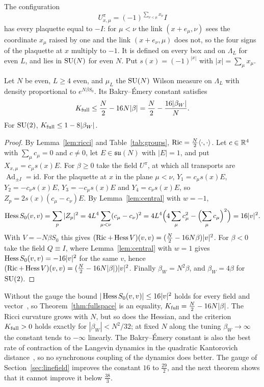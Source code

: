 The configuration
\begin{equation}\label{eq:piflux}
U^\pi_{x,\mu}=(-1)^{\sum_{\nu<\mu}x_\nu}I
\end{equation}
has every plaquette equal to $-I$: for $\mu<\nu$ the link $(x+e_\mu,\nu)$ sees
the coordinate $x_\mu$ raised by one and the link $(x+e_\nu,\mu)$ does not, so
the four signs of the plaquette at $x$ multiply to $-1$. It is defined on every
box and on $\Lambda_L$ for even $L$, and lies in $\mathrm{SU}(N)$ for even $N$. Put
$s(x)=(-1)^{|x|}$ with $|x|=\sum_\mu x_\mu$.

\begin{theorem}\label{thm:fullspace}
Let $N$ be even, $L\ge4$ even, and $\mu_L$ the $\mathrm{SU}(N)$ Wilson measure on
$\Lambda_L$ with density proportional to $e^{N\beta S_0}$. Its Bakry--\'Emery
constant satisfies
\[
K_{\rm full}\le\frac N2-16N|\beta|=\frac N2-\frac{16|\beta_W|}N .
\]
For $\mathrm{SU}(2)$, $K_{\rm full}\le1-8|\beta_W|$.
\end{theorem}

\begin{proof}
By Lemma~\ref{lem:ricci} and Table~\ref{tab:groups}, $\operatorname{Ric}=\frac N2\langle \cdot,\cdot\rangle$.
Let $c\in\mathbb{R}^4$ with $\sum_\mu c_\mu=0$ and $c\ne0$, let $E\in\mathfrak{su}(N)$
with $|E|=1$, and put $X_{x,\mu}=c_\mu s(x)E$. For $\beta\ge0$ take the field
$U^\pi$, at which all transports are $\operatorname{Ad}_{\pm I}=\mathrm{id}$.
For the plaquette at $x$ in the plane $\mu<\nu$, $Y_1=c_\mu s(x)E$,
$Y_2=-c_\nu s(x)E$, $Y_3=-c_\mu s(x)E$ and $Y_4=c_\nu s(x)E$, so $Z_p=2s(x)(c_\mu-
c_\nu)E$. By Lemma~\ref{lem:central} with $w=-1$,
\[
\operatorname{Hess} S_0(v,v)=\sum_p|Z_p|^2=4L^4\sum_{\mu<\nu}(c_\mu-c_\nu)^2=4L^4\Bigl(4\sum_\mu
c_\mu^2-\Bigl(\sum_\mu c_\mu\Bigr)^2\Bigr)=16|v|^2 .
\]
With $V=-N\beta S_0$ this gives $(\operatorname{Ric}+\operatorname{Hess} V)(v,v)=(\frac N2-16N\beta)|v|^2$.
For $\beta<0$ take the field $Q\equiv I$, where Lemma~\ref{lem:central} with
$w=1$ gives $\operatorname{Hess} S_0(v,v)=-16|v|^2$ for the same $v$, hence $(\operatorname{Ric}+\operatorname{Hess} V)(v,
v)=(\frac N2-16N|\beta|)|v|^2$. Finally $\beta_W=N^2\beta$, and $\beta_W=4\beta$
for $\mathrm{SU}(2)$.
\end{proof}

Without the gauge the bound $|\operatorname{Hess} S_0(v,v)|\le16|v|^2$ holds for every field
and vector~\cite{BB26a}, so Theorem~\ref{thm:fullspace} is an equality,
$K_{\rm full}=\frac N2-16N|\beta|$. The Ricci curvature grows with $N$, but so
does the Hessian, and the criterion $K_{\rm full}>0$ holds exactly for
$|\beta_W|<N^2/32$; at fixed $N$ along the tuning $\beta_W\to\infty$ the
constant tends to $-\infty$ linearly. The Bakry--\'Emery constant is also the
best rate of contraction of the Langevin dynamics in the quadratic Kantorovich
distance~\cite{vRS05}, so no synchronous coupling of the dynamics does better.
The gauge of Section~\ref{sec:linefield} improves the constant $16$ to
$\frac{29}2$, and the next theorem shows that it cannot improve it below
$\frac{38}3$.

